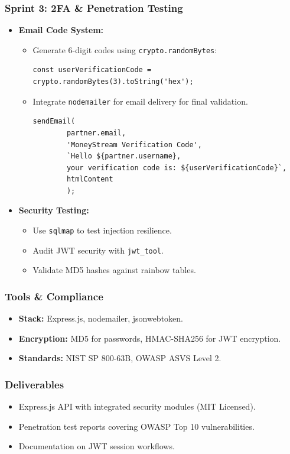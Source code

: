 \subsubsection*{Sprint 3: 2FA \& Penetration Testing}  
\begin{itemize}  
    \item \textbf{Email Code System:}  
    \begin{itemize}  
        \item Generate 6-digit codes using \texttt{crypto.randomBytes}:  
        \begin{verbatim}  
const userVerificationCode = crypto.randomBytes(3).toString('hex');
        \end{verbatim}  
        \item Integrate \texttt{nodemailer} for email delivery for final validation.  
        \begin{verbatim}
sendEmail(
        partner.email,
        'MoneyStream Verification Code',
        `Hello ${partner.username},
        your verification code is: ${userVerificationCode}`,
        htmlContent
        );
        \end{verbatim}
    \end{itemize}  
    \item \textbf{Security Testing:}  
    \begin{itemize}  
        \item Use \texttt{sqlmap} to test injection resilience.  
        \item Audit JWT security with \texttt{jwt\_tool}.  
        \item Validate MD5 hashes against rainbow tables.  
    \end{itemize}  
\end{itemize}  

\subsubsection*{Tools \& Compliance}  
\begin{itemize}  
    \item \textbf{Stack:} Express.js, nodemailer, jsonwebtoken.  
    \item \textbf{Encryption:} MD5 for passwords, HMAC-SHA256 for JWT encryption.  
    \item \textbf{Standards:} NIST SP 800-63B, OWASP ASVS Level 2.  
\end{itemize}  

\subsubsection*{Deliverables}  
\begin{itemize}  
    \item Express.js API with integrated security modules (MIT Licensed).  
    \item Penetration test reports covering OWASP Top 10 vulnerabilities.  
    \item Documentation on JWT session workflows.  
\end{itemize}  

